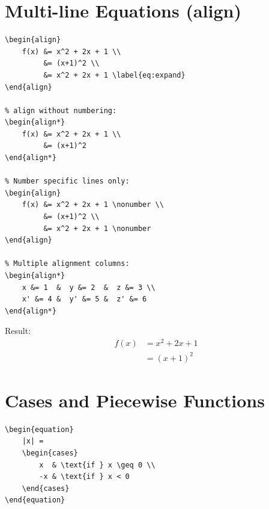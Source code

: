 \section{Multi-line Equations (align)}

\begin{lstlisting}[language={[LaTeX]TeX}, caption=align environment]
\begin{align}
    f(x) &= x^2 + 2x + 1 \\
         &= (x+1)^2 \\
         &= x^2 + 2x + 1 \label{eq:expand}
\end{align}

% align without numbering:
\begin{align*}
    f(x) &= x^2 + 2x + 1 \\
         &= (x+1)^2
\end{align*}

% Number specific lines only:
\begin{align}
    f(x) &= x^2 + 2x + 1 \nonumber \\
         &= (x+1)^2 \\
         &= x^2 + 2x + 1 \nonumber
\end{align}

% Multiple alignment columns:
\begin{align*}
    x &= 1  &  y &= 2  &  z &= 3 \\
    x' &= 4 &  y' &= 5 &  z' &= 6
\end{align*}
\end{lstlisting}

Result:
\begin{align}
    f(x) &= x^2 + 2x + 1 \label{eq:quadratic} \\
         &= (x+1)^2 \nonumber
\end{align}

\section{Cases and Piecewise Functions}

\begin{lstlisting}[language={[LaTeX]TeX}, caption=cases environment]
\begin{equation}
    |x| =
    \begin{cases}
        x  & \text{if } x \geq 0 \\
        -x & \text{if } x < 0
    \end{cases}
\end{equation}
\end{lstlisting}

